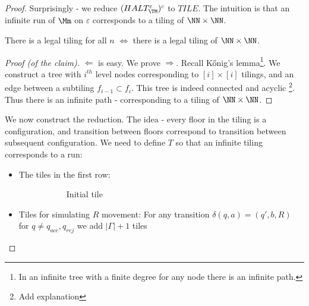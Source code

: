 \begin{proof}
	Surprisingly - we reduce $(HALT_\TM^\varepsilon)^c$ to $TILE$. The intuition is that an infinite run of $\Mm$ on $\varepsilon$ corresponds to a tiling of $\NN\times \NN$. 
	\begin{claim}
		There is a legal tiling for all $n$ $\iff$ there is a legal tiling of $\NN\times \NN$.
	\end{claim}
	\begin{proof}[Proof (of the claim)]
			$\Leftarrow$ is easy. We prove $\Rightarrow$. Recall Kőnig's lemma\footnote{In an infinite tree with a finite degree for any node there is an infinite path.}. We construct a tree with $i^{th}$ level nodes corresponding to $[i]\times [i]$ tilings, and an edge between a subtiling $f_{i-1}\subset f_i$. This tree is indeed connected and acyclic \footnote{Add explanation}. Thus there is an infinite path - corresponding to a tiling of $\NN\times \NN$.
	\end{proof}
We now construct the reduction. The idea - every floor in the tiling is a configuration, and transition between floors correspond to transition between subsequent configuration. We need to define $T$ so that an infinite tiling corresponds to a run:
\begin{itemize}
	\item The tiles in the first row:
	\begin{figure}[H]
		\begin{subfigure}{.5\textwidth}
			\centering
		\caption{Initial tile}
		\end{subfigure}
	\begin{subfigure}{.5\textwidth}
					\centering
	\end{subfigure}
	\end{figure}
\item Tiles for simulating $R$ movement: For any transition $\delta(q,a) = (q', b, R)$ for $q\neq q_{acc}, q_{rej}$ we add $|\Gamma| + 1$ tiles

\end{itemize}
\end{proof}
